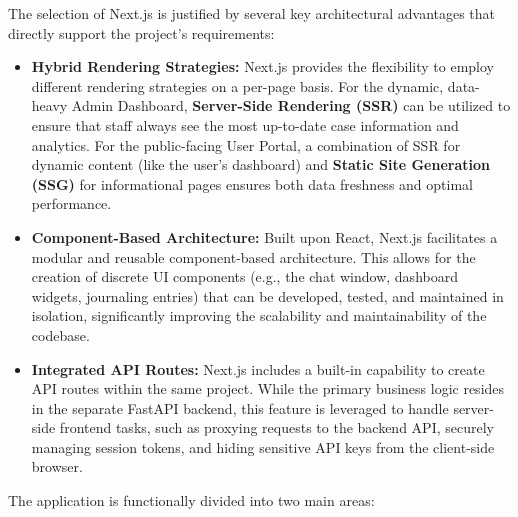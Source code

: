 The selection of Next.js is justified by several key architectural advantages that directly support the project's requirements:

\begin{itemize}
    \item \textbf{Hybrid Rendering Strategies:} Next.js provides the flexibility to employ different rendering strategies on a per-page basis. For the dynamic, data-heavy Admin Dashboard, \textbf{Server-Side Rendering (SSR)} can be utilized to ensure that staff always see the most up-to-date case information and analytics. For the public-facing User Portal, a combination of SSR for dynamic content (like the user's dashboard) and \textbf{Static Site Generation (SSG)} for informational pages ensures both data freshness and optimal performance.
    \item \textbf{Component-Based Architecture:} Built upon React, Next.js facilitates a modular and reusable component-based architecture. This allows for the creation of discrete UI components (e.g., the chat window, dashboard widgets, journaling entries) that can be developed, tested, and maintained in isolation, significantly improving the scalability and maintainability of the codebase.
    \item \textbf{Integrated API Routes:} Next.js includes a built-in capability to create API routes within the same project. While the primary business logic resides in the separate FastAPI backend, this feature is leveraged to handle server-side frontend tasks, such as proxying requests to the backend API, securely managing session tokens, and hiding sensitive API keys from the client-side browser.
\end{itemize}

The application is functionally divided into two main areas:

